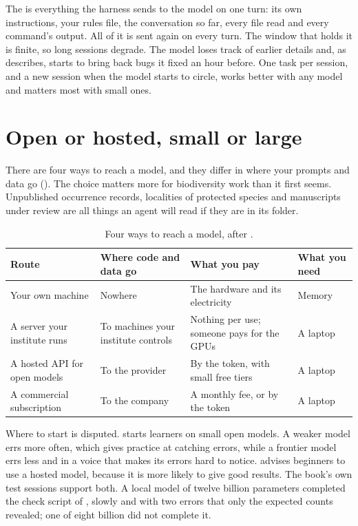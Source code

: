 \documentclass[11pt,a4paper]{article}
\begin{document}
The  is everything the harness sends to the model on one turn:
its own instructions, your rules file, the conversation so far, every file
read and every command's output. All of it is sent again on every turn. The
window that holds it is finite, so long sessions degrade. The model loses
track of earlier details and, as \textcite{eren2026agenticcoding} describes,
starts to bring back bugs it fixed an hour before. One task per session, and
a new session when the model starts to circle, works better with any model
and matters most with small ones.

\section{Open or hosted, small or large}
\label{sec:routes}

There are four ways to reach a model, and they differ in where your prompts
and data go (). The choice matters more for biodiversity
work than it first seems. Unpublished occurrence records, localities of
protected species and manuscripts under review are all things an agent will
read if they are in its folder.

\begin{table}[htbp]
\centering
\caption{Four ways to reach a model, after \textcite{eren2026agenticcoding}.}
\label{tab:routes}
\small
\begin{tabularx}{\textwidth}{lXXl}
\toprule
\textbf{Route} & \textbf{Where code and data go} & \textbf{What you pay} & \textbf{What you need} \\
\midrule
Your own machine & Nowhere & The hardware and its electricity & Memory \\
A server your institute runs & To machines your institute controls & Nothing per use; someone pays for the GPUs & A laptop \\
A hosted API for open models & To the provider & By the token, with small free tiers & A laptop \\
A commercial subscription & To the company & A monthly fee, or by the token & A laptop \\
\bottomrule
\end{tabularx}
\end{table}

Where to start is disputed. \textcite{eren2026agenticcoding} starts learners
on small open models. A weaker model errs more often, which gives practice at
catching errors, while a frontier model errs less and in a voice that makes
its errors hard to notice. \textcite{wickham2026nobs} advises beginners to
use a hosted model, because it is more likely to give good results. The
book's own test sessions support both. A local model of twelve billion
parameters completed the check script of , slowly and with
two errors that only the expected counts revealed; one of eight billion did
not complete it.
\end{document}
